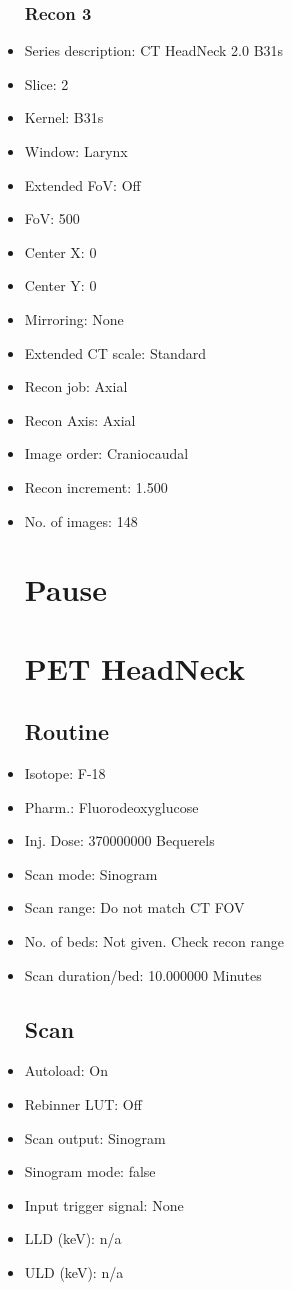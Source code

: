 \documentclass[12pt]{article}
\begin{document}
\begin{itemize}
\subsubsection{Recon 3}
\item Series description: CT HeadNeck 2.0 B31s
\item Slice: 2
\item Kernel: B31s
\item Window: Larynx
\item Extended FoV: Off
\item FoV: 500
\item Center X: 0
\item Center Y: 0
\item Mirroring: None
\item Extended CT scale: Standard
\item Recon job: Axial
\item Recon Axis: Axial
\item Image order: Craniocaudal
\item Recon increment: 1.500
\item No. of images: 148
\section{Pause}
\section{PET HeadNeck}\subsection{Routine}
\item Isotope: F-18
\item Pharm.: Fluorodeoxyglucose
\item Inj. Dose: 370000000 Bequerels
\item Scan mode: Sinogram
\item Scan range: Do not match CT FOV
\item No. of beds: Not given. Check recon range
\item Scan duration/bed: 10.000000 Minutes
\subsection{Scan}
\item Autoload: On
\item Rebinner LUT: Off
\item Scan output: Sinogram
\item Sinogram mode: false
\item Input trigger signal: None
\item LLD (keV): n/a
\item ULD (keV): n/a

\end{itemize}
\end{document}
